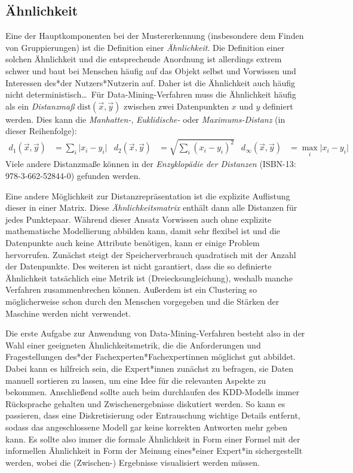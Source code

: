 		\subsection{Ähnlichkeit}
			Eine der Hauptkomponenten bei der Mustererkennung (insbesondere dem Finden von Gruppierungen) ist die Definition einer \emph{Ähnlichkeit}. Die Definition einer solchen Ähnlichkeit und die entsprechende Anordnung ist allerdings extrem schwer und baut bei Menschen häufig auf das Objekt selbst und Vorwissen und Interessen des*der Nutzers*Nutzerin auf. Daher ist die Ähnlichkeit auch häufig nicht deterministisch\dots~Für Data-Mining-Verfahren muss die Ähnlichkeit häufig als ein \emph{Distanzmaß} \( \mathrm{dist}(\vec{x}, \vec{y}) \) zwischen zwei Datenpunkten \(x\) und \(y\) definiert werden. Dies kann \zB die \emph{Manhatten-}, \emph{Euklidische-} oder \emph{Maximums-Distanz} (in dieser Reihenfolge):
			\begin{align}
				d_1(\vec{x}, \vec{y}) &= \sum_i \lvert x_i - y_i \rvert &
				d_2(\vec{x}, \vec{y}) &= \sqrt{\sum_i (x_i - y_i)^2} &
				d_\infty(\vec{x}, \vec{y}) &= \max_i \lvert x_i - y_i \rvert
			\end{align}
			Viele andere Distanzmaße können in der \emph{Enzyklopädie der Distanzen} (ISBN-13: 978-3-662-52844-0) gefunden werden.

			Eine andere Möglichkeit zur Distanzrepräsentation ist die explizite Auflistung dieser in einer Matrix. Diese \emph{Ähnlichkeitsmatrix} enthält dann alle Distanzen für jedes Punktepaar. Während dieser Ansatz Vorwissen auch ohne explizite mathematische Modellierung abbilden kann, damit sehr flexibel ist und die Datenpunkte auch keine Attribute benötigen, kann er einige Problem hervorrufen. Zunächst steigt der Speicherverbrauch quadratisch mit der Anzahl der Datenpunkte. Des weiteren ist nicht garantiert, dass die so definierte Ähnlichkeit tatsächlich eine Metrik ist (Dreiecksungleichung), weshalb manche Verfahren zusammenbrechen können. Außerdem ist ein Clustering so möglicherweise schon durch den Menschen vorgegeben und die Stärken der Maschine werden nicht verwendet.

			Die erste Aufgabe zur Anwendung von Data-Mining-Verfahren besteht also in der Wahl einer geeigneten Ähnlichkeitsmetrik, die die Anforderungen und Fragestellungen des*der Fachexperten*Fachexpertinnen möglichst gut abbildet. Dabei kann es hilfreich sein, die Expert*innen zunächst zu befragen, \bzw sie Daten manuell sortieren zu lassen, um eine Idee für die relevanten Aspekte zu bekommen. Anschließend sollte auch beim durchlaufen des KDD-Modells immer Rücksprache gehalten und Zwischenergebnisse diskutiert werden. So kann es \bspw passieren, dass eine Diskretisierung oder Entrauschung wichtige Details entfernt, sodass das angeschlossene Modell gar keine korrekten Antworten mehr geben kann. Es sollte also immer die formale Ähnlichkeit in Form einer Formel mit der informellen Ähnlichkeit in Form der Meinung eines*einer Expert*in sichergestellt werden, wobei die (Zwischen-) Ergebnisse visualisiert werden müssen.

